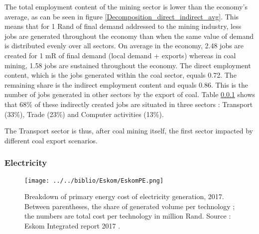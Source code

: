 \documentclass[12pt,english]{article}
\begin{document}
%


The total employment content of the mining sector is lower than the economy's average, as can be seen in figure \ref{Decomposition_direct_indirect_avg}. This means that for 1 Rand of final demand addressed to the mining industry, less jobs are generated throughout the economy than when the same value of demand is distributed evenly over all sectors. On average in the economy, 2.48 jobs are created for 1 mR of final demand (local demand + exports) whereas in coal mining, 1.58 jobs are sustained throughout the economy. %
The direct employment content, which is the jobs generated within the coal sector, equals 0.72. The remaining share is the indirect employment content and equals 0.86. This is the number of jobs generated in other sectors by the export of coal. Table \ref{} shows that 68\% of these indirectly created jobs are situated in three sectors : Transport (33\%), Trade (23\%) and Computer activities (13\%). 

The Transport sector is thus, after coal mining itself, the first sector impacted by different coal export scenarios. 



\subsubsection{Electricity}

\begin{figure}[!h]
	\centering
	\texttt{[image: ../../biblio/Eskom/EskomPE.png]}
	\caption{\label{Eskom2017PE}Breakdown of primary energy cost of electricity generation, 2017. Between parentheses, the share of generated volume per technology ; the numbers are total cost per technology in million Rand. Source : Eskom Integrated report 2017 \citep{Eskom2017AR}.}
\end{figure}
\end{document}
